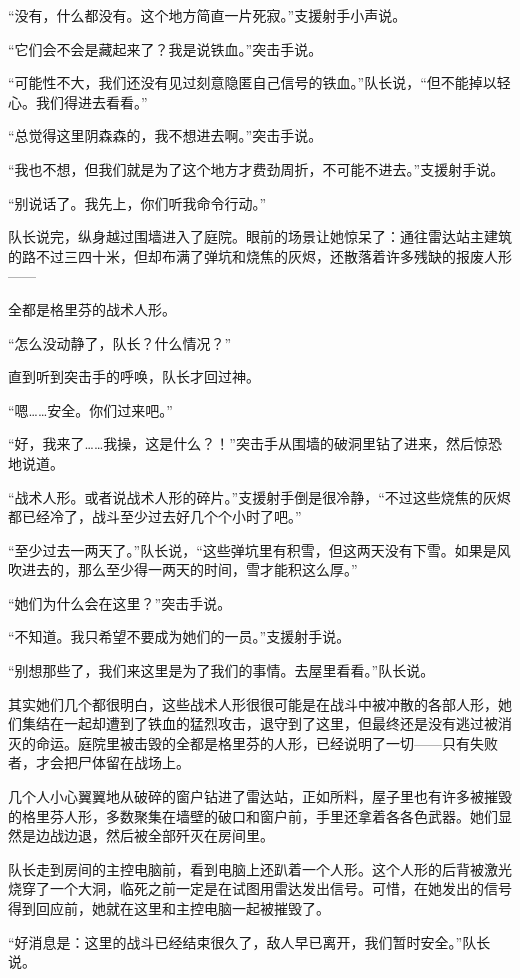 “没有，什么都没有。这个地方简直一片死寂。”支援射手小声说。

“它们会不会是藏起来了？我是说铁血。”突击手说。

“可能性不大，我们还没有见过刻意隐匿自己信号的铁血。”队长说，“但不能掉以轻心。我们得进去看看。”

“总觉得这里阴森森的，我不想进去啊。”突击手说。

“我也不想，但我们就是为了这个地方才费劲周折，不可能不进去。”支援射手说。

“别说话了。我先上，你们听我命令行动。”

队长说完，纵身越过围墙进入了庭院。眼前的场景让她惊呆了：通往雷达站主建筑的路不过三四十米，但却布满了弹坑和烧焦的灰烬，还散落着许多残缺的报废人形——

全都是格里芬的战术人形。

“怎么没动静了，队长？什么情况？”

直到听到突击手的呼唤，队长才回过神。

“嗯……安全。你们过来吧。”

“好，我来了……我操，这是什么？！”突击手从围墙的破洞里钻了进来，然后惊恐地说道。

“战术人形。或者说战术人形的碎片。”支援射手倒是很冷静，“不过这些烧焦的灰烬都已经冷了，战斗至少过去好几个个小时了吧。”

“至少过去一两天了。”队长说，“这些弹坑里有积雪，但这两天没有下雪。如果是风吹进去的，那么至少得一两天的时间，雪才能积这么厚。”

“她们为什么会在这里？”突击手说。

“不知道。我只希望不要成为她们的一员。”支援射手说。

“别想那些了，我们来这里是为了我们的事情。去屋里看看。”队长说。

其实她们几个都很明白，这些战术人形很很可能是在战斗中被冲散的各部人形，她们集结在一起却遭到了铁血的猛烈攻击，退守到了这里，但最终还是没有逃过被消灭的命运。庭院里被击毁的全都是格里芬的人形，已经说明了一切——只有失败者，才会把尸体留在战场上。

几个人小心翼翼地从破碎的窗户钻进了雷达站，正如所料，屋子里也有许多被摧毁的格里芬人形，多数聚集在墙壁的破口和窗户前，手里还拿着各各色武器。她们显然是边战边退，然后被全部歼灭在房间里。

队长走到房间的主控电脑前，看到电脑上还趴着一个人形。这个人形的后背被激光烧穿了一个大洞，临死之前一定是在试图用雷达发出信号。可惜，在她发出的信号得到回应前，她就在这里和主控电脑一起被摧毁了。

“好消息是：这里的战斗已经结束很久了，敌人早已离开，我们暂时安全。”队长说。

